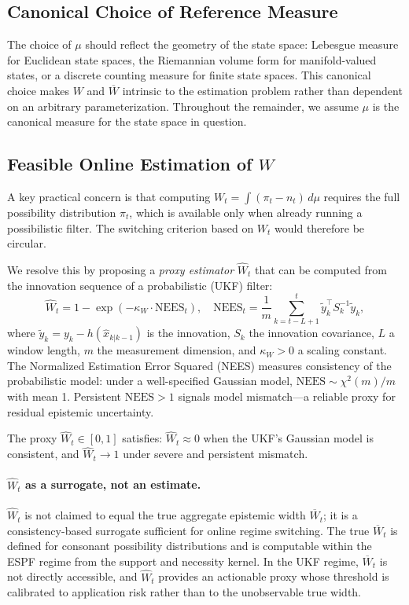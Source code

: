 \documentclass[12pt]{article}
\begin{document}
\subsection{Canonical Choice of Reference Measure}
\label{sec:canonical_mu}

The choice of $\mu$ should reflect the geometry of the state space:
Lebesgue measure for Euclidean state spaces, the Riemannian volume form for
manifold-valued states, or a discrete counting measure for finite state spaces.
This canonical choice makes $W$ and $\overline{W}$ intrinsic to the
estimation problem rather than dependent on an arbitrary parameterization.
Throughout the remainder, we assume $\mu$ is the canonical measure for the
state space in question.

\subsection{Feasible Online Estimation of $W$}
\label{sec:W_estimation}

A key practical concern is that
computing $W_t = \int(\pi_t - n_t)\,d\mu$ requires the full possibility
distribution $\pi_t$, which is available only when already running a
possibilistic filter.
The switching criterion based on $W_t$ would therefore be circular.

We resolve this by proposing a \emph{proxy estimator} $\widehat{W}_t$ that
can be computed from the innovation sequence of a probabilistic (UKF) filter:
\begin{equation}
\widehat{W}_t = 1 - \exp\!\left(-\kappa_W \cdot \mathrm{NEES}_t\right),
\quad
\mathrm{NEES}_t = \frac{1}{m}\sum_{k=t-L+1}^{t}
  \tilde{y}_k^\top S_k^{-1} \tilde{y}_k,
\label{eq:W_hat}
\end{equation}
where $\tilde{y}_k = y_k - h(\hat{x}_{k|k-1})$ is the innovation,
$S_k$ the innovation covariance, $L$ a window length, $m$ the measurement
dimension, and $\kappa_W>0$ a scaling constant.
The Normalized Estimation Error Squared (NEES) measures consistency of the
probabilistic model: under a well-specified Gaussian model,
$\mathrm{NEES}\sim\chi^2(m)/m$ with mean 1.
Persistent $\mathrm{NEES}>1$ signals model mismatch---a reliable proxy for
residual epistemic uncertainty.

The proxy $\widehat{W}_t\in[0,1]$ satisfies:
$\widehat{W}_t\approx 0$ when the UKF's Gaussian model is consistent,
and $\widehat{W}_t\to 1$ under severe and persistent mismatch.

\paragraph{$\widehat{W}_t$ as a surrogate, not an estimate.}
$\widehat{W}_t$ is not claimed to equal the true aggregate epistemic width
$\overline{W}_t$; it is a consistency-based surrogate sufficient for online
regime switching.
The true $\overline{W}_t$ is defined for consonant possibility distributions
and is computable within the ESPF regime from the support and necessity kernel.
In the UKF regime, $\overline{W}_t$ is not directly accessible, and
$\widehat{W}_t$ provides an actionable proxy whose threshold is calibrated
to application risk rather than to the unobservable true width.
\end{document}
